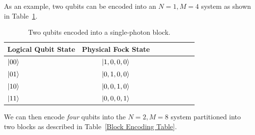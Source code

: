 \documentclass[aps,pra,twocolumn,superscriptaddress,floatfix,10pt]{revtex4}
\begin{document}
As an example, two qubits can be encoded into an $N=1,M=4$ system as shown in Table~\ref{Two Qubit Encoding Table}.
\begin {table}[h]
\begin{center}
	\begin{tabular}{l*{6}{c}r} 
		Logical Qubit State      \quad \quad \quad     & Physical Fock State \\
		\hline 
		\quad \quad \quad $\ket{00}$     & $\ket{1,0,0,0}$ \\
		\quad \quad \quad $\ket{01}$            & $\ket{0,1,0,0}$ \\
		\quad \quad \quad $\ket{10}$            & $\ket{0,0,1,0}$ \\
		\quad \quad \quad $\ket{11}$            & $\ket{0,0,0,1}$ \\
	\end{tabular}
	\caption{ \label{Two Qubit Encoding Table} Two qubits encoded into a single-photon block.}
\end{center}
\end{table}
We can then encode \textit{four} qubits into the $N=2,M=8$ system partitioned into two blocks as described in Table~\ref{Block Encoding Table}.
\end{document}
